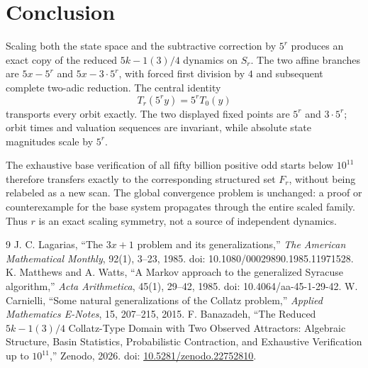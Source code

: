 \documentclass[11pt]{article}
\theoremstyle{remark}\newtheorem{remark}{Remark}
\begin{document}
\section{Conclusion}
Scaling both the state space and the subtractive correction by $5^r$ produces an exact copy of the reduced $5k-1(3)/4$ dynamics on $S_r$. The two affine branches are $5x-5^r$ and $5x-3\cdot5^r$, with forced first division by $4$ and subsequent complete two-adic reduction. The central identity
\[
T_r(5^ry)=5^rT_0(y)
\]
transports every orbit exactly. The two displayed fixed points are $5^r$ and $3\cdot5^r$; orbit times and valuation sequences are invariant, while absolute state magnitudes scale by $5^r$.

The exhaustive base verification of all fifty billion positive odd starts below $10^{11}$ therefore transfers exactly to the corresponding structured set $F_r$, without being relabeled as a new scan. The global convergence problem is unchanged: a proof or counterexample for the base system propagates through the entire scaled family. Thus $r$ is an exact scaling symmetry, not a source of independent dynamics.

\begin{thebibliography}{9}
 J. C. Lagarias, ``The $3x+1$ problem and its generalizations,'' \emph{The American Mathematical Monthly}, 92(1), 3--23, 1985. doi: 10.1080/00029890.1985.11971528.
 K. Matthews and A. Watts, ``A Markov approach to the generalized Syracuse algorithm,'' \emph{Acta Arithmetica}, 45(1), 29--42, 1985. doi: 10.4064/aa-45-1-29-42.
 W. Carnielli, ``Some natural generalizations of the Collatz problem,'' \emph{Applied Mathematics E-Notes}, 15, 207--215, 2015.
 F. Banazadeh, ``The Reduced $5k-1(3)/4$ Collatz-Type Domain with Two Observed Attractors: Algebraic Structure, Basin Statistics, Probabilistic Contraction, and Exhaustive Verification up to $10^{11}$,'' Zenodo, 2026. doi: \href{https://doi.org/10.5281/zenodo.22752810}{10.5281/zenodo.22752810}.
\end{thebibliography}
\end{document}
